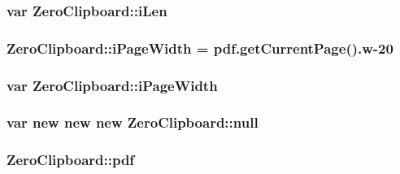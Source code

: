 \hypertarget{class_zero_clipboard_a249befb1af7eb431a5ce5b63344df54d}{
\subsubsection[{i\+Len}]{\setlength{\rightskip}{0pt plus 5cm}var Zero\+Clipboard\+::i\+Len}}\label{class_zero_clipboard_a249befb1af7eb431a5ce5b63344df54d}
\hypertarget{class_zero_clipboard_a14bb672128ccb19450473f6fbf097e5a}{
\subsubsection[{i\+Page\+Width}]{\setlength{\rightskip}{0pt plus 5cm}Zero\+Clipboard\+::i\+Page\+Width = pdf.\+get\+Current\+Page().w-\/20}}\label{class_zero_clipboard_a14bb672128ccb19450473f6fbf097e5a}
\hypertarget{class_zero_clipboard_ad1b22090b64a946187b46fd832054e07}{
\subsubsection[{i\+Page\+Width}]{\setlength{\rightskip}{0pt plus 5cm}var Zero\+Clipboard\+::i\+Page\+Width}}\label{class_zero_clipboard_ad1b22090b64a946187b46fd832054e07}
\hypertarget{class_zero_clipboard_a07e1a60f83830226b8aac053dcef7b9c}{
\subsubsection[{null}]{\setlength{\rightskip}{0pt plus 5cm}var new new new Zero\+Clipboard\+::null}}\label{class_zero_clipboard_a07e1a60f83830226b8aac053dcef7b9c}
\hypertarget{class_zero_clipboard_a8c06dba36f3a02bf368444f1fa0054af}{
\subsubsection[{pdf}]{ Zero\+Clipboard\+::pdf}}\label{class_zero_clipboard_a8c06dba36f3a02bf368444f1fa0054af}

